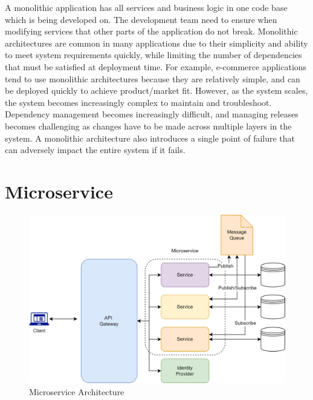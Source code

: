 \documentclass[MMR,Master,nenglish]{twbook}%
\begin{document}
\noindent
A monolithic application has all services and business logic in one code base which is being developed on. The development team need to ensure when modifying services that other parts of the application do not break. Monolithic architectures are common in many applications due to their simplicity and ability to meet system requirements quickly, while limiting the number of dependencies that must be satisfied at deployment time. For example, e-commerce applications tend to use monolithic architectures because they are relatively simple, and can be deployed quickly to achieve product/market fit. However, as the system scales, the system becomes increasingly complex to maintain and troubleshoot. Dependency management becomes increasingly difficult, and managing releases becomes challenging as changes have to be made across multiple layers in the system. A monolithic architecture also introduces a single point of failure that can adversely impact the entire system if it fails.\cite{vil2015}


\section{Microservice}
\begin{figure} [H]
 \begin{center}
    \includegraphics[width=1\linewidth]{img/Microservice.png}
 \end{center}
 \caption{Microservice Architecture}
 \label{microservice}
\end{figure}
\end{document}
